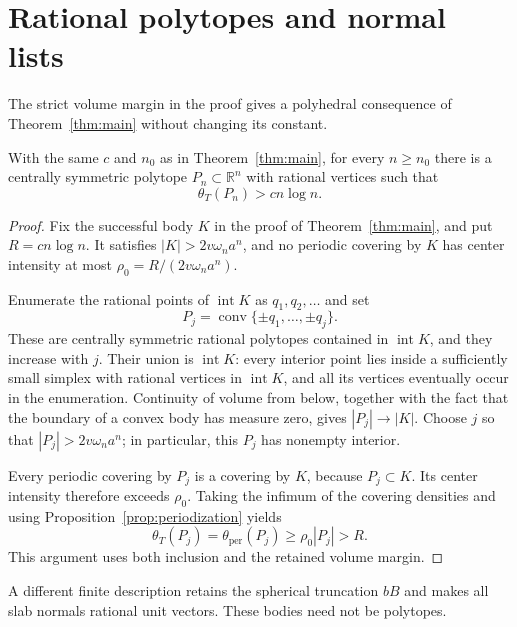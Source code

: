 \section{Rational polytopes and normal lists}\label{sec:encoding}

The strict volume margin in the proof gives a polyhedral consequence of
Theorem~\ref{thm:main} without changing its constant.

\begin{corollary}\label{cor:rational-polytope}
With the same $c$ and $n_0$ as in Theorem~\ref{thm:main}, for every
$n\ge n_0$ there is a centrally symmetric polytope
$P_n\subset\mathbb R^n$ with rational vertices such that
\[
 \theta_T(P_n)>c n\log n.
\]
\end{corollary}
\begin{proof}
Fix the successful body $K$ in the proof of Theorem~\ref{thm:main},
and put $R=c n\log n$. It satisfies
$|K|>2v\omega_na^n$, and no periodic covering by $K$ has center
intensity at most $\rho_0=R/(2v\omega_na^n)$.

Enumerate the rational points of $\operatorname{int}K$ as
$q_1,q_2,\ldots$ and set
\[
 P_j=\operatorname{conv}\{\pm q_1,\ldots,\pm q_j\}.
\]
These are centrally symmetric rational polytopes contained in
$\operatorname{int}K$, and they increase with $j$. Their union is
$\operatorname{int}K$: every interior point lies inside a sufficiently
small simplex with rational vertices in $\operatorname{int}K$, and
all its vertices eventually occur in the enumeration. Continuity of
volume from below, together with the fact that the boundary of a convex
body has measure zero, gives $|P_j|\to|K|$. Choose $j$ so that
$|P_j|>2v\omega_na^n$; in particular, this $P_j$ has nonempty interior.

Every periodic covering by $P_j$ is a covering by $K$, because
$P_j\subset K$. Its center intensity therefore exceeds $\rho_0$.
Taking the infimum of the covering densities and using
Proposition~\ref{prop:periodization} yields
\[
 \theta_T(P_j)=\theta_{\mathrm{per}}(P_j)
       \ge\rho_0|P_j|>R.
\]
This argument uses both inclusion and the retained volume margin.
\end{proof}

A different finite description retains the spherical truncation $bB$
and makes all slab normals rational unit vectors. These bodies need not
be polytopes.

